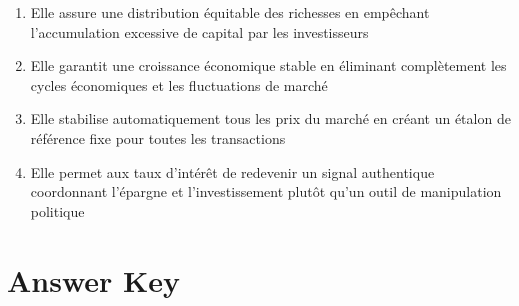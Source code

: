 \documentclass[12pt,a4paper]{article}
\begin{document}
\begin{enumerate}[label=\Alph*., leftmargin=*]
\item Elle assure une distribution équitable des richesses en empêchant l'accumulation excessive de capital par les investisseurs
\item Elle garantit une croissance économique stable en éliminant complètement les cycles économiques et les fluctuations de marché
\item Elle stabilise automatiquement tous les prix du marché en créant un étalon de référence fixe pour toutes les transactions
\item Elle permet aux taux d'intérêt de redevenir un signal authentique coordonnant l'épargne et l'investissement plutôt qu'un outil de manipulation politique
\end{enumerate}

\bigskip


\newpage
\section*{Answer Key}
\end{document}
